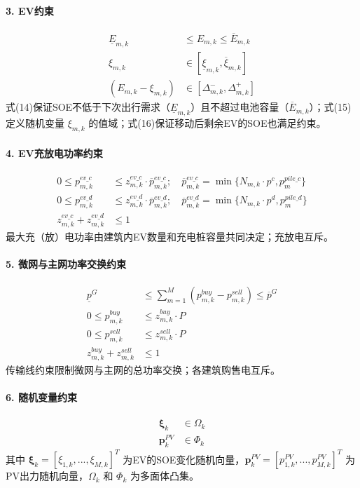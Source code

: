 \documentclass[11pt]{ctexart}
\begin{document}
\paragraph{3. EV约束}
\begin{align}
    \underline{E}_{m,k} &\le E_{m,k} \le \overline{E}_{m,k} \\
    \xi_{m,k} &\in [\underline{\xi}_{m,k}, \overline{\xi}_{m,k}] \\
    (E_{m,k} - \xi_{m,k}) &\in [\Delta_{m,k}^-, \Delta_{m,k}^+]
\end{align}
式(14)保证SOE不低于下次出行需求（$\underline{E}_{m,k}$）且不超过电池容量（$\overline{E}_{m,k}$）；式(15)定义随机变量 $\xi_{m,k}$ 的值域；式(16)保证移动后剩余EV的SOE也满足约束。

\paragraph{4. EV充放电功率约束}
\begin{align}
    0 \le p_{m,k}^{ev\_c} &\le z_{m,k}^{ev\_c} \cdot \overline{p}_{m,k}^{ev\_c}; \quad \overline{p}_{m,k}^{ev\_c} = \min\{N_{m,k} \cdot p^c, p_m^{pile\_c}\} \\
    0 \le p_{m,k}^{ev\_d} &\le z_{m,k}^{ev\_d} \cdot \overline{p}_{m,k}^{ev\_d}; \quad \overline{p}_{m,k}^{ev\_d} = \min\{N_{m,k} \cdot p^d, p_m^{pile\_d}\} \\
    z_{m,k}^{ev\_c} + z_{m,k}^{ev\_d} &\le 1
\end{align}
最大充（放）电功率由建筑内EV数量和充电桩容量共同决定；充放电互斥。

\paragraph{5. 微网与主网功率交换约束}
\begin{align}
    \underline{p}^G &\le \sum_{m=1}^{M} (p_{m,k}^{buy} - p_{m,k}^{sell}) \le \overline{p}^G \\
    0 \le p_{m,k}^{buy} &\le z_{m,k}^{buy} \cdot P \\
    0 \le p_{m,k}^{sell} &\le z_{m,k}^{sell} \cdot P \\
    z_{m,k}^{buy} + z_{m,k}^{sell} &\le 1
\end{align}
传输线约束限制微网与主网的总功率交换；各建筑购售电互斥。

\paragraph{6. 随机变量约束}
\begin{align}
    \boldsymbol{\xi}_k &\in \Omega_k \\
    \boldsymbol{p}_k^{PV} &\in \Phi_k
\end{align}
其中 $\boldsymbol{\xi}_k = [\xi_{1,k}, ..., \xi_{M,k}]^T$ 为EV的SOE变化随机向量，$\boldsymbol{p}_k^{PV} = [p_{1,k}^{PV}, ..., p_{M,k}^{PV}]^T$ 为PV出力随机向量，$\Omega_k$ 和 $\Phi_k$ 为多面体凸集。
\end{document}
